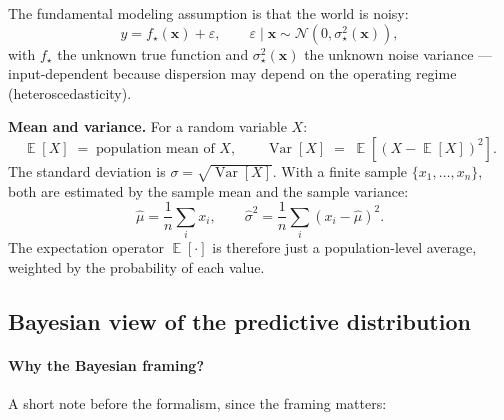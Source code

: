 \documentclass[11pt,a4paper]{article}
\DeclareMathOperator{\Var}{Var}
\DeclareMathOperator{\E}{\mathbb{E}}
\begin{document}
The fundamental modeling assumption is that the world is noisy:
\begin{equation}
y = f_\star(\bm x) + \varepsilon, \qquad \varepsilon \mid \bm x \sim \mathcal{N}(0, \sigma_\star^2(\bm x)),
\label{eq:data-model}
\end{equation}
with $f_\star$ the unknown true function and $\sigma_\star^2(\bm x)$ the unknown noise variance --- input-dependent because dispersion may depend on the operating regime (heteroscedasticity).

\begin{recapbox}
\textbf{Mean and variance.} For a random variable $X$:
\[
\E[X] \;=\; \text{population mean of } X, \qquad
\Var[X] \;=\; \E\!\left[(X - \E[X])^2\right].
\]
The standard deviation is $\sigma = \sqrt{\Var[X]}$. With a finite sample $\{x_1, \ldots, x_n\}$, both are estimated by the sample mean and the sample variance:
\[
\hat\mu = \frac{1}{n}\sum_i x_i, \qquad
\hat\sigma^2 = \frac{1}{n}\sum_i (x_i - \hat\mu)^2.
\]
The expectation operator $\E[\cdot]$ is therefore just a population-level average, weighted by the probability of each value.
\end{recapbox}

\subsection{Bayesian view of the predictive distribution}

\paragraph{Why the Bayesian framing?} A short note before the formalism, since the framing matters:
\end{document}
